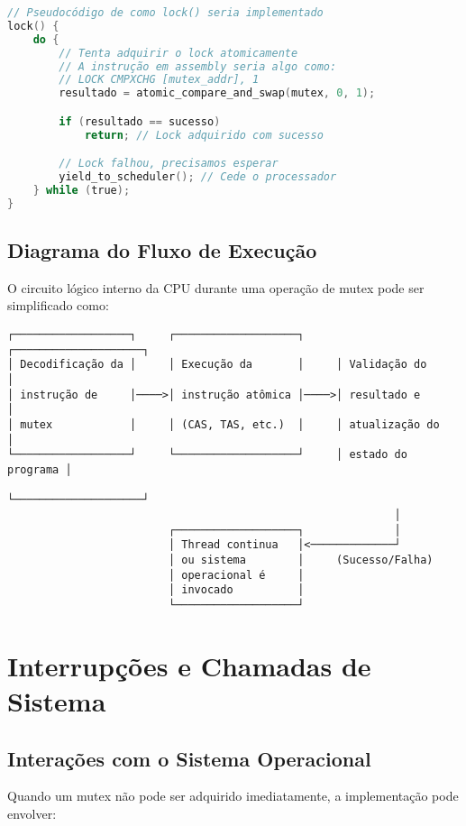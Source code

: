 \documentclass[12pt]{article}
\begin{document}
\begin{lstlisting}[language=C]
// Pseudocódigo de como lock() seria implementado
lock() {
    do {
        // Tenta adquirir o lock atomicamente
        // A instrução em assembly seria algo como:
        // LOCK CMPXCHG [mutex_addr], 1
        resultado = atomic_compare_and_swap(mutex, 0, 1);

        if (resultado == sucesso)
            return; // Lock adquirido com sucesso

        // Lock falhou, precisamos esperar
        yield_to_scheduler(); // Cede o processador
    } while (true);
}
\end{lstlisting}

\subsection{Diagrama do Fluxo de Execução}

O circuito lógico interno da CPU durante uma operação de mutex pode ser simplificado como:

\begin{verbatim}
┌──────────────────┐     ┌───────────────────┐     ┌────────────────────┐
│ Decodificação da │     │ Execução da       │     │ Validação do       │
│ instrução de     │────>│ instrução atômica │────>│ resultado e        │
│ mutex            │     │ (CAS, TAS, etc.)  │     │ atualização do     │
└──────────────────┘     └───────────────────┘     │ estado do programa │
                                                   └────────────────────┘
                                                            │
                         ┌───────────────────┐              │
                         │ Thread continua   │<─────────────┘
                         │ ou sistema        │     (Sucesso/Falha)
                         │ operacional é     │
                         │ invocado          │
                         └───────────────────┘
\end{verbatim}

\section{Interrupções e Chamadas de Sistema}

\subsection{Interações com o Sistema Operacional}

Quando um mutex não pode ser adquirido imediatamente, a implementação pode envolver:
\end{document}
